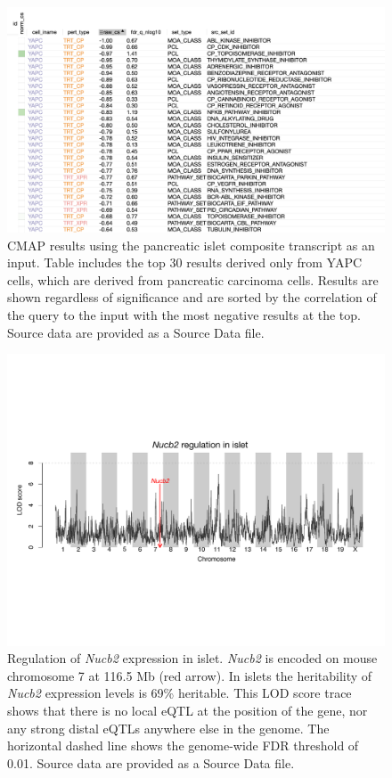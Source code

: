 \documentclass[
]{article}
\begin{document}
\begin{figure}[ht!]
\includegraphics[width=\textwidth]{Figures/Supp_Fig_Islet_YAPC.png} 
\caption{CMAP results using the pancreatic islet composite 
transcript as an input. Table includes the top 30 results derived
only from YAPC cells, which are derived from pancreatic
carcinoma cells. Results are shown regardless of significance and
are sorted by the correlation of the query to the input 
with the most negative results at the top. Source data are 
provided as a Source Data file.
}
\label{fig:clue_islet_yapc}
\end{figure}

\begin{figure}[ht!]
\includegraphics[width=\textwidth]{Figures/Supp_Fig14_Nucb2_eQTL.pdf} 
\caption{Regulation of \textit{Nucb2} expression in islet. \textit{Nucb2} 
is encoded on mouse chromosome 7 at 116.5 Mb (red arrow). In islets the 
heritability of \textit{Nucb2} expression levels is 69\% heritable. This 
LOD score trace shows that there is no local eQTL at the position of the
gene, nor any strong distal eQTLs anywhere else in the genome. The 
horizontal dashed line shows the genome-wide FDR threshold of 0.01.
Source data are provided as a Source Data file.
}
\label{fig:Nucb2_eqtl}
\end{figure}
\end{document}
